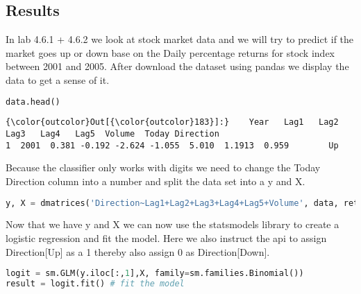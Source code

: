 \subsection{Results}
In lab 4.6.1 + 4.6.2 we look at stock market data and we will try to predict if the market goes up or down base on the Daily percentage returns for stock index between 2001 and 2005.
After download the dataset using pandas we display the data to get a sense of it.
\begin{lstlisting}[language=Python]
data.head()
\end{lstlisting}
\begin{Verbatim}[commandchars=\\\{\}]
{\color{outcolor}Out[{\color{outcolor}183}]:}    Year   Lag1   Lag2   Lag3   Lag4   Lag5  Volume  Today Direction
1  2001  0.381 -0.192 -2.624 -1.055  5.010  1.1913  0.959        Up
\end{Verbatim}
Because the classifier only works with digits we need to change the Today Direction column into a number and split the data set into a y and X.
\begin{lstlisting}[language=Python]
y, X = dmatrices('Direction~Lag1+Lag2+Lag3+Lag4+Lag5+Volume', data, return_type = 'dataframe')
\end{lstlisting}
Now that we have y and X we can now use the statsmodels library to create a logistic regression and fit the model. Here we also instruct the api to assign Direction[Up] as a 1 thereby also assign 0 as Direction[Down].
\begin{lstlisting}[language=Python]
logit = sm.GLM(y.iloc[:,1],X, family=sm.families.Binomial())
result = logit.fit() # fit the model
\end{lstlisting}


